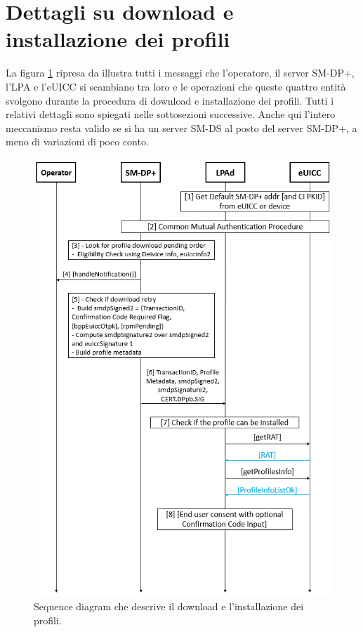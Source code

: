 \documentclass[10pt, twoside, openany]{book}
\begin{document}
\section{Dettagli su download e installazione dei profili}\label{sec:down-install}
La figura \ref{fig:download-install} ripresa da \cite{GSMA-docs-new} illustra tutti i messaggi che l'operatore, il server SM-DP+, l'LPA e l'eUICC si scambiano tra loro e le operazioni che queste quattro entità svolgono durante la procedura di download e installazione dei profili. Tutti i relativi dettagli \cite{GSMA-docs-new} sono spiegati nelle sottosezioni successive. Anche qui l'intero meccanismo resta valido se si ha un server SM-DS al posto del server SM-DP+, a meno di variazioni di poco conto.
\begin{figure}
\includegraphics[width=\linewidth]{download-install.png}
\caption{Sequence diagram che descrive il download e l'installazione dei profili.}
\label{fig:download-install}
\end{figure}
\end{document}

